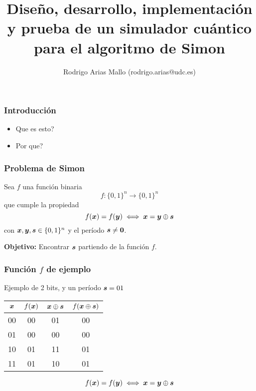 
\title{Diseño, desarrollo, implementación y prueba de un simulador cuántico para 
el algoritmo de Simon}

\author{Rodrigo Arias Mallo (rodrigo.arias@udc.es)}







\frame{\titlepage}

\begin{frame}
\frametitle{Introducción}

\begin{itemize}
\item Que es esto?
\item Por que?
\end{itemize}

\end{frame}
\begin{frame}
\frametitle{Problema de Simon}
Sea $f$ una función binaria
$$f:\{0,1\}^n \rightarrow \{0,1\}^n$$
que cumple la propiedad
$$ f(\boldsymbol{x}) = f(\boldsymbol{y}) \iff \boldsymbol{x} = \boldsymbol{y} \oplus \boldsymbol{s}$$
con $\boldsymbol{x}, \boldsymbol{y}, \boldsymbol{s} \in \{0,1\}^n$ y el período $\boldsymbol{s} \neq \boldsymbol{0}$.

\vspace{1cm}

\textbf{Objetivo: }Encontrar $\boldsymbol{s}$ partiendo de la función $f$.


\end{frame}
\begin{frame}
\frametitle{Función $f$ de ejemplo}

Ejemplo de 2 bits, y un período $\boldsymbol{s} = 01$

\begin{center}
\begin{tabular}{cccc}
	\toprule
	$\boldsymbol{x}$ & $f(\boldsymbol{x})$ & $\boldsymbol{x} \oplus \boldsymbol{s}$ & $f(\boldsymbol{x} \oplus \boldsymbol{s})$\\
	\midrule
	00 & 00 & 01 & 00\\
	01 & 00 & 00 & 00\\
	10 & 01 & 11 & 01\\
	11 & 01 & 10 & 01\\
	\bottomrule
\end{tabular}
\end{center}

$$ f(\boldsymbol{x}) = f(\boldsymbol{y}) \iff \boldsymbol{x} = \boldsymbol{y} \oplus \boldsymbol{s}$$

\end{frame}
